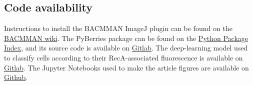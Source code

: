 \subsection*{Code availability}
Instructions to install the BACMMAN ImageJ plugin can be found on the \href{https://github.com/jeanollion/bacmman/wiki/Installation}{BACMMAN wiki}. The PyBerries package can be found on the \href{https://pypi.org/project/PyBerries/}{Python Package Index}, and its source code is available on \href{https://gitlab.com/MEKlab/pyberries}{Gitlab}. The deep-learning model used to classify cells according to their RecA-associated fluorescence is available on \href{https://gitlab.com/MEKlab/bacmman-object-classifier}{Gitlab}. The Jupyter Notebooks used to make the article figures are available on \href{https://github.com/DanielThedie/RecB_article}{Github}.
